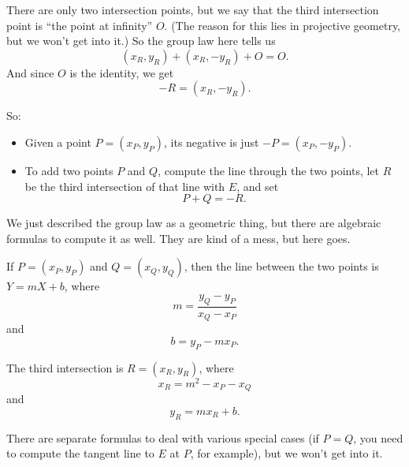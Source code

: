 There are only two intersection points, but we say that the third
intersection point is ``the point at infinity'' $O$. (The reason for
this lies in projective geometry, but we won't get into it.) So the
group law here tells us
\[( x_{R},y_{R} ) + ( x_{R}, - y_{R} ) + O = O.\]
And since $O$ is the identity, we get
\[- R = ( x_{R}, - y_{R} ).\]

So:

\begin{itemize}
\item Given a point $P = ( x_{P},y_{P} )$, its negative is just
  $- P = ( x_{P}, - y_{P} )$.
\item To add two points $P$ and $Q$, compute the line through the two
  points, let $R$ be the third intersection of that line with $E$,
  and set \[P + Q = - R.\]
\end{itemize}

We just described the group law as a geometric thing, but there are
algebraic formulas to compute it as well. They are kind of a mess, but
here goes.

If $P = ( x_{P},y_{P} )$ and
$Q = ( x_{Q},y_{Q} )$, then the line between the two points
is $Y = mX + b$, where \[m = \frac{y_{Q} - y_{P}}{x_{Q} - x_{P}}\] and
\[b = y_{P} - mx_{P}.\]

The third intersection is $R = ( x_{R},y_{R} )$, where
\[x_{R} = m^{2} - x_{P} - x_{Q}\] and \[y_{R} = mx_{R} + b.\]

There are separate formulas to deal with various special cases (if
$P = Q$, you need to compute the tangent line to $E$ at $P$, for
example), but we won't get into it.
